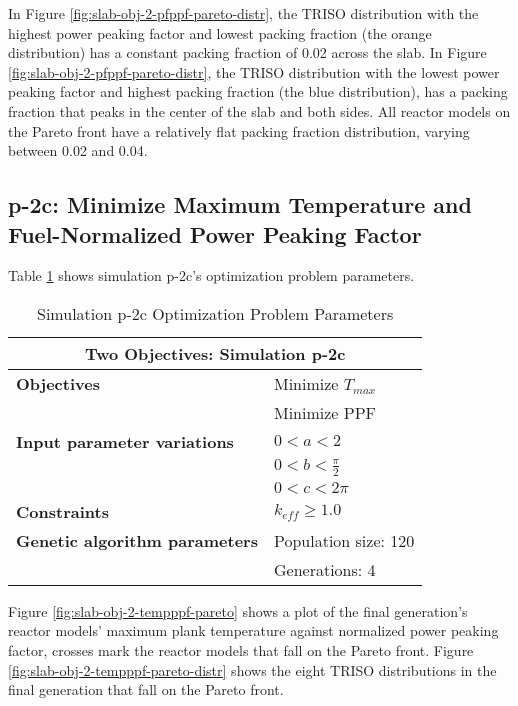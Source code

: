 In Figure \ref{fig:slab-obj-2-pfppf-pareto-distr}, the TRISO distribution with the 
highest power peaking factor and lowest packing fraction (the orange distribution) has 
a constant packing fraction of 0.02 across the slab. 
In Figure \ref{fig:slab-obj-2-pfppf-pareto-distr}, the TRISO distribution with the 
lowest power peaking factor and highest packing fraction (the blue distribution), has 
a packing fraction that peaks in the center of the slab and both sides. 
All reactor models on the Pareto front have a relatively flat packing fraction 
distribution, varying between 0.02 and 0.04. 

\subsection{p-2c: Minimize Maximum Temperature and Fuel-Normalized Power Peaking Factor}
\label{sec:p-2c}
Table \ref{tab:simulationp2c} shows simulation p-2c's optimization problem parameters. 
\begin{table}[htbp]
    \centering
    \onehalfspacing
    \caption{Simulation p-2c Optimization Problem Parameters}
	\label{tab:simulationp2c}
    \footnotesize
    \begin{tabular}{l|p{3cm}}
    \hline 
    \multicolumn{2}{c}{\textbf{Two Objectives: Simulation p-2c}} \\
    \hline 
    \textbf{Objectives} & Minimize $T_{max}$ \\
    & Minimize PPF \\
    \hline 
    \textbf{Input parameter variations} & $0<a<2$ \\
    & $0<b<\frac{\pi}{2}$ \\
    & $0<c<2\pi$ \\
    \hline
    \textbf{Constraints} & $k_{eff} \geq 1.0$\\ 
    \hline 
    \textbf{Genetic algorithm parameters} & Population size: 120 \\
    & Generations: 4 \\
    \hline
    \end{tabular}
\end{table}
Figure \ref{fig:slab-obj-2-tempppf-pareto} shows a plot of the final generation's reactor models' 
maximum plank temperature against normalized power peaking factor, crosses mark the reactor 
models that fall on the Pareto front.
Figure \ref{fig:slab-obj-2-tempppf-pareto-distr} shows the eight TRISO distributions in 
the final generation that fall on the Pareto front. 
